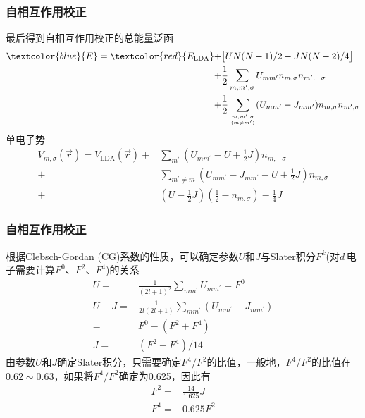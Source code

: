 \frame
{
	\frametitle{自相互作用校正}
	最后得到自相互作用校正的总能量泛函
	\begin{displaymath}
		\begin{aligned}
			\textcolor{blue}{E}=\textcolor{red}{E_{\mathrm{LDA}}}+&\big[UN(N-1)/2-JN(N-2)/4\big]\\
			+&\frac12\sum_{m,m^{\prime},\sigma}U_{mm^{\prime}}n_{m,\sigma}n_{m^{\prime},-\sigma}\\
			+&\frac12\sum_{m,m^{\prime},\sigma\atop(m\neq m^{\prime})}(U_{mm^{\prime}}-J_{mm^{\prime}})n_{m,\sigma}n_{m^{\prime},\sigma}
		\end{aligned}
	\end{displaymath}
	单电子势
	\begin{displaymath}
		\begin{aligned}
			V_{m,\sigma}(\vec r)=V_{\mathrm{LDA}}(\vec r)+&\sum_{m^{\prime}}(U_{mm^{\prime}}-U+\frac12J)n_{m,-\sigma}\\
			+&\sum_{m^{\prime}\neq m}(U_{mm^{\prime}}-J_{mm^{\prime}}-U+\frac12J)n_{m,\sigma}\\
			+&(U-\frac12J)(\frac12-n_{m,\sigma})-\frac14J
		\end{aligned}
	\end{displaymath}
}

\frame
{
	\frametitle{自相互作用校正}
	根据\textrm{Clebsch-Gordan (CG)}系数的性质，可以确定参数$U$和$J$与\textrm{Slater}积分$F^k$(对$d$\,电子需要计算$F^0$、$F^2$、$F^4$)的关系
	\begin{displaymath}
		\begin{aligned}
			U=&\frac1{(2l+1)^2}\sum_{mm^{\prime}}U_{mm^{\prime}}=F^0\\
			U-J=&\frac1{2l(2l+1)}\sum_{mm^{\prime}}(U_{mm^{\prime}}-J_{mm^{\prime}})\\
			=&F^0-(F^2+F^4)	\\
			J=&(F^2+F^4)/14
		\end{aligned}
	\end{displaymath}
	由参数$U$和$J$确定\textrm{Slater}积分，只需要确定$F^4/F^2$的比值，一般地，$F^4/F^2$的比值在$0.62\sim0.63$，如果将$F^4/F^2$确定为0.625，因此有
	\begin{displaymath}
		\begin{aligned}
			F^2=&\frac{14}{1.625}J\\
			F^4=&0.625F^2
		\end{aligned}
	\end{displaymath}
}

